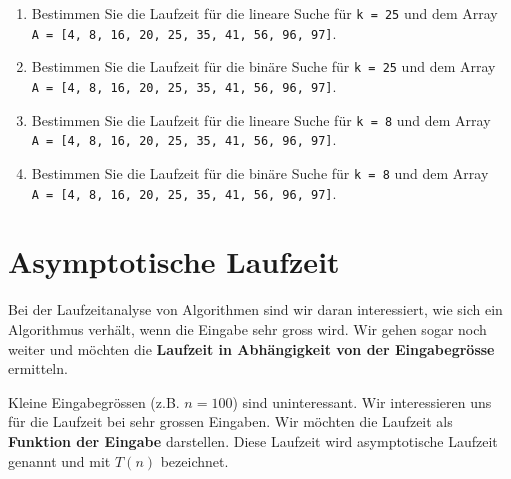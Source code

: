 \begin{enumerate}
\item Bestimmen Sie die Laufzeit für die lineare Suche für \lstinline[language=pseudocode]{k = 25} und dem Array \\ \lstinline[language=pseudocode]{A = [4, 8, 16, 20, 25, 35, 41, 56, 96, 97]}.

\fillwithgrid	{0.25in}

\item Bestimmen Sie die Laufzeit für die binäre Suche für \lstinline[language=pseudocode]{k = 25} und dem Array \\ \lstinline[language=pseudocode]{A = [4, 8, 16, 20, 25, 35, 41, 56, 96, 97]}.

\fillwithgrid	{0.25in}

\item Bestimmen Sie die Laufzeit für die lineare Suche für \lstinline[language=pseudocode]{k = 8} und dem Array \\ \lstinline[language=pseudocode]{A = [4, 8, 16, 20, 25, 35, 41, 56, 96, 97]}.

\fillwithgrid	{0.25in}

\item Bestimmen Sie die Laufzeit für die binäre Suche für \lstinline[language=pseudocode]{k = 8} und dem Array \\ \lstinline[language=pseudocode]{A = [4, 8, 16, 20, 25, 35, 41, 56, 96, 97]}.

\fillwithgrid	{0.25in}

\end{enumerate}

\section{Asymptotische Laufzeit}

Bei der Laufzeitanalyse von Algorithmen sind wir daran interessiert, wie sich ein Algorithmus verhält, wenn die Eingabe sehr gross wird. Wir gehen sogar noch weiter und möchten die \textbf{Laufzeit in Abhängigkeit von der Eingabegrösse} ermitteln.

\begin{definition}
	Kleine Eingabegrössen (z.B. $n = 100$) sind uninteressant. Wir interessieren uns für die Laufzeit bei sehr grossen Eingaben. Wir möchten die Laufzeit als \textbf{Funktion der Eingabe} darstellen. Diese Laufzeit wird asymptotische Laufzeit genannt und mit $T(n)$ bezeichnet.
\end{definition}

